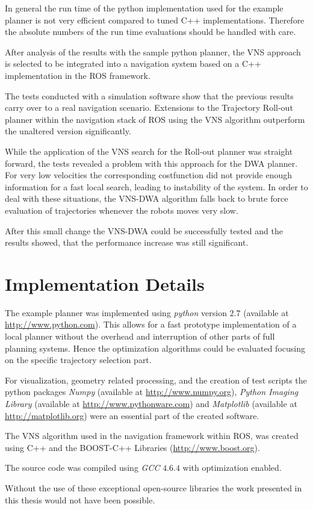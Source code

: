 In general the run time of the python implementation used for the example planner is not very efficient compared to tuned C++ implementations. 
Therefore the absolute numbers of the run time evaluations should be handled with care.

After analysis of the results with the sample python planner, the VNS approach is selected to be integrated into a navigation system based on a C++ implementation in the ROS framework.

The tests conducted with a simulation software show that the previous results carry over to a real navigation scenario. Extensions to the Trajectory Roll-out planner within the navigation stack of ROS using the VNS algorithm outperform the unaltered version significantly.

While the application of the VNS search for the Roll-out planner was straight forward, the tests revealed a problem with this approach for the DWA planner.
For very low velocities the corresponding costfunction did not provide enough information for a fast local search, leading to instability of the system.
In order to deal with these situations, the VNS-DWA algorithm falls back to brute force evaluation of trajectories whenever the robots moves very slow. 

After this small change the VNS-DWA could be successfully tested and the results showed, that the performance increase was still significant.

\section{Implementation Details}
The example planner was implemented using \emph{python} version $2.7$ (available at \url{http://www.python.com}). This allows for a fast prototype implementation of a local planner without the overhead and interruption of other parts of full planning systems.
Hence the optimization algorithms could be evaluated focusing on the  specific trajectory selection part. 

For visualization, geometry related processing, and the creation of test scripts the python packages \emph{Numpy} (available at \url{http://www.numpy.org}), \emph{Python Imaging Library} (available at \url{http://www.pythonware.com}) and \emph{Matplotlib} (available at \url{http://matplotlib.org}) were an essential part of the created software. 

The VNS algorithm used in the navigation framework within ROS, was created using C++ and the BOOST-C++ Libraries (\url{http://www.boost.org}).

The source code was compiled using \emph{GCC} $4.6.4$ with optimization enabled.

Without the use of these exceptional open-source libraries the work presented in this thesis would not have been possible.  

 


